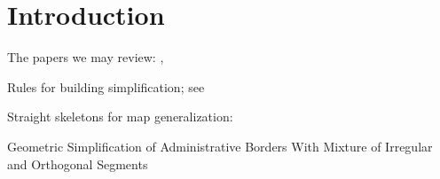 \documentclass[graybox]{svmult}
\begin{document}
%

\abstract*{\myabstract}

\abstract{\myabstract}



\section{Introduction}
\label{sec:Introduction}

The papers we may review:   
\textcite{vanSmaalen2003, Buchin2016, Chaudhry2008, Stoter2009},

Rules for building simplification; see \textcite{Lee2005}

Straight skeletons for map generalization: 
\textcite{Gold2003,Matuk2006}

Geometric Simplification of Administrative Borders With Mixture 
of
Irregular and Orthogonal Segments \parencite{Samsonov2016}
\end{document}

